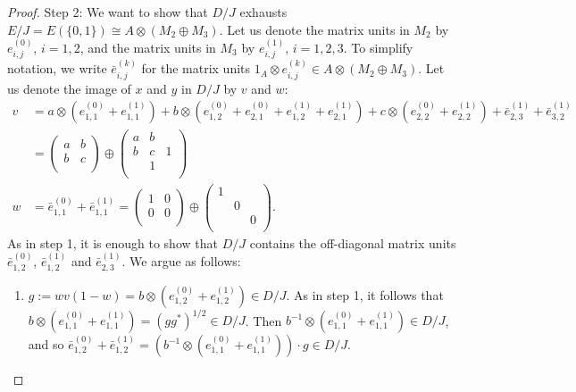 \documentclass{amsart}
\theoremstyle{definition}
\begin{document}
\begin{proof}
    Step 2:
    We want to show that $D/J$ exhausts $E/J=E(\{0,1\})\cong A\otimes (M_2 \oplus M_3)$.
    Let us denote the matrix units in $M_2$ by $e_{i,j}^{(0)}$, $i=1,2$, and the matrix units in $M_3$ by $e_{i,j}^{(1)}$, $i=1,2,3$.
    To simplify notation, we write $\bar{e}_{i,j}^{(k)}$ for the matrix units $1_A\otimes e_{i,j}^{(k)}\in A\otimes (M_2 \oplus M_3)$.
    Let us denote the image of $x$ and $y$ in $D/J$ by $v$ and $w$:
    \begin{align*}
        v &= a\otimes (e_{1,1}^{(0)} + e_{1,1}^{(1)})
        + b\otimes (e_{1,2}^{(0)} + e_{2,1}^{(0)} + e_{1,2}^{(1)} + e_{2,1}^{(1)} )
        + c\otimes (e_{2,2}^{(0)}+ e_{2,2}^{(1)})
        + \bar{e}_{2,3}^{(1)} + \bar{e}_{3,2}^{(1)}\\
        &= \begin{pmatrix}
            a & b\\
            b & c \\
        \end{pmatrix}
        \oplus
        \begin{pmatrix}
            a & b\\
            b & c & 1 \\
            & 1 & \\
        \end{pmatrix}
        \\
        w &= \bar{e}_{1,1}^{(0)} + \bar{e}_{1,1}^{(1)}
        =\begin{pmatrix}
            1 & 0 \\
            0 & 0 \\
        \end{pmatrix}
        \oplus
        \begin{pmatrix}
            1 & & \\
            & 0 & \\
            & & 0 \\
        \end{pmatrix}.
    \end{align*}
    As in step 1, it is enough to show that $D/J$ contains the off-diagonal matrix units $\bar{e}_{1,2}^{(0)}$, $\bar{e}_{1,2}^{(1)}$ and $\bar{e}_{2,3}^{(1)}$.
    We argue as follows:
    \begin{enumerate}[1.  ]
        \item
        $g:=wv(1-w)=b\otimes (e_{1,2}^{(0)} + e_{1,2}^{(1)})\in D/J$.
        As in step 1, it follows that $b\otimes (e_{1,1}^{(0)} + e_{1,1}^{(1)})=(gg^*)^{1/2}\in D/J$.
        Then $b^{-1}\otimes (e_{1,1}^{(0)} + e_{1,1}^{(1)})\in D/J$, and so $\bar{e}_{1,2}^{(0)} + \bar{e}_{1,2}^{(1)}=(b^{-1}\otimes (e_{1,1}^{(0)} + e_{1,1}^{(1)}))\cdot g\in D/J$.

\end{enumerate}
\end{proof}
\end{document}
